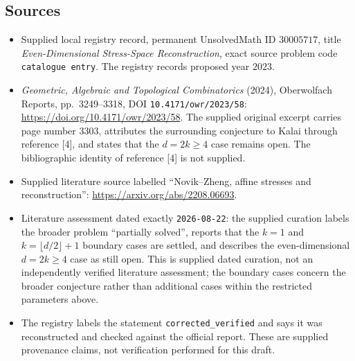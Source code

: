 \documentclass[11pt]{article}
\begin{document}
\subsection{Sources}
\begin{itemize}
\item Supplied local registry record, permanent UnsolvedMath ID \(30005717\), title \emph{Even-Dimensional Stress-Space Reconstruction}, exact source problem code \texttt{catalogue entry}. The registry records proposed year \(2023\).
\item \emph{Geometric, Algebraic and Topological Combinatorics} (2024), Oberwolfach Reports, pp.\ 3249--3318, DOI \texttt{10.4171/owr/2023/58}: \url{https://doi.org/10.4171/owr/2023/58}. The supplied original excerpt carries page number \(3303\), attributes the surrounding conjecture to Kalai through reference [4], and states that the \(d=2k\geq4\) case remains open. The bibliographic identity of reference [4] is not supplied.
\item Supplied literature source labelled ``Novik--Zheng, affine stresses and reconstruction'': \url{https://arxiv.org/abs/2208.06693}.
\item Literature assessment dated exactly \texttt{2026-08-22}: the supplied curation labels the broader problem ``partially solved'', reports that the \(k=1\) and \(k=\lfloor d/2\rfloor+1\) boundary cases are settled, and describes the even-dimensional \(d=2k\geq4\) case as still open. This is supplied dated curation, not an independently verified literature assessment; the boundary cases concern the broader conjecture rather than additional cases within the restricted parameters above.
\item The registry labels the statement \texttt{corrected\_verified} and says it was reconstructed and checked against the official report. These are supplied provenance claims, not verification performed for this draft.
\end{itemize}
\end{document}
